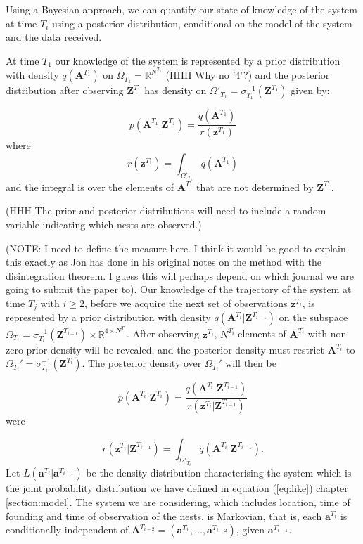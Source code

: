\documentclass{article}
\renewcommand{\vec}[1]{\mathbf{#1}}
\begin{document}
Using a Bayesian approach, we can quantify our state of knowledge of the system at time $T_i$ using a posterior distribution, conditional on the model of the system and the data received.

At time $T_1$ our knowledge of the system is represented by a prior distribution with density $q(\vec{A}^{T_1})$ on $\Omega_{T_1} = \mathbb{R}^{N^{T_1}}$ (HHH Why no '4'?) and the posterior distribution after observing $\vec{Z}^{T_1}$ has density on $\Omega'_{T_1} = \sigma_{T_1}^{-1}(\vec{Z}^{T_1})$ given by:

\begin{equation*}
    p(\vec{A}^{T_1} | \vec{Z}^{T_1}) = \frac{q(\vec{A}^{T_1})}{r(\vec{z}^{T_1})}
\end{equation*}
where
\begin{equation*}
    r(\vec{z}^{T_1}) = \int_{\Omega'_{T_1}} q(\vec{A}^{T_1}) 
\end{equation*}
and the integral is over the elements of $\vec{A}^{T_1}$ that are not determined by $\vec{Z}^{T_1}$.

(HHH The prior and posterior distributions will need to include a random variable indicating which nests are observed.)

(NOTE: I need to define the measure here. I think it would be good to explain this exactly as Jon has done in his original notes on the method with the disintegration theorem. I guess this will perhaps depend on which journal we are going to submit the paper to).
Our knowledge of the trajectory of the system at time $T_j$ with $i \geq 2$, before we acquire the next set of observations $\vec{z}^{T_i}$, is represented by a prior distribution with density $q(\vec{A}^{T_i} | \vec{Z}^{T_{i-1}})$ on the subspace $\Omega_{T_i} = \sigma_{T_i}^{-1} (\vec{Z}^{T_{i-1}}) \times \mathbb{R}^{4 \times N^{T_i}}$. After observing $\vec{z}^{T_i}$, $N^{T_i}$ elements of $\vec{A}^{T_i}$ with non zero prior density will be revealed, and the posterior density must restrict $\vec{A}^{T_i}$ to $\Omega_{T_i}' = \sigma_{T_i}^{-1}(\vec{Z}^{T_i})$. The posterior density over $\Omega_{T_i}'$ will then be

\begin{equation*}
    p(\vec{A}^{T_i} | \vec{Z}^{T_i}) = \frac{q(\vec{A}^{T_i} | \vec{Z}^{T_{i-1}})}{r(\vec{z}^{T_i} | \vec{Z}^{T_{i-1}})}
\end{equation*}
were

\begin{equation*}
    r(\vec{z}^{T_i} | \vec{Z}^{T_{i-1}}) = \int_{\Omega'_{T_i}} q(\vec{A}^{T_i} | \vec{Z}^{T_{i-1}}).
\end{equation*}
Let $L(\vec{a}^{T_i} | \vec{a}^{T_{i-1}})$ be the density distribution characterising the system which is the joint probability distribution we have defined in equation (\ref{eq:like}) chapter  \ref{section:model}. The system we are considering, which includes location, time of founding and time of observation of the nests, is Markovian, that is, each $\vec{a}^{T_i}$ is conditionally independent of $\vec{A}^{T_{i-2}} = (\vec{a}^{T_1}, \ldots,\vec{a}^{T_{i-2}})$, given $\vec{a}^{T_{i-1}}$.
\end{document}
